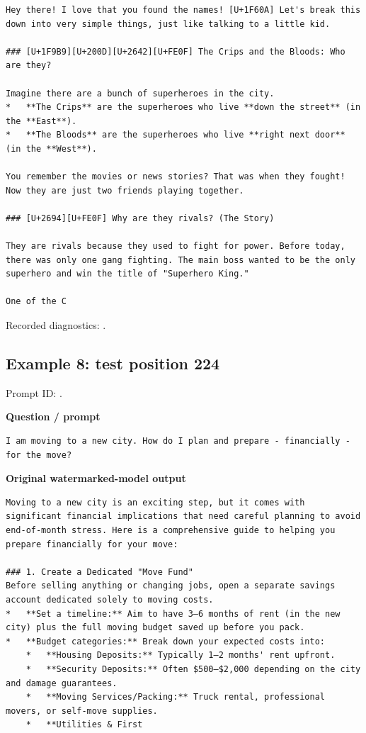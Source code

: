 \begin{Verbatim}
Hey there! I love that you found the names! [U+1F60A] Let's break this down into very simple things, just like talking to a little kid.

### [U+1F9B9][U+200D][U+2642][U+FE0F] The Crips and the Bloods: Who are they?

Imagine there are a bunch of superheroes in the city.
*   **The Crips** are the superheroes who live **down the street** (in the **East**).
*   **The Bloods** are the superheroes who live **right next door** (in the **West**).

You remember the movies or news stories? That was when they fought! Now they are just two friends playing together.

### [U+2694][U+FE0F] Why are they rivals? (The Story)

They are rivals because they used to fight for power. Before today, there was only one gang fighting. The main boss wanted to be the only superhero and win the title of "Superhero King."

One of the C
\end{Verbatim}

Recorded diagnostics:
\texttt{}.

\subsection{Example 8: test position
224}\label{record-docs-watermarking-qualitative-text-textseal2-smoothing-md-example-8-test-position-224}

Prompt ID:
\texttt{}.

\textbf{Question / prompt}

\begin{Verbatim}
I am moving to a new city. How do I plan and prepare - financially - for the move?
\end{Verbatim}

\textbf{Original watermarked-model output}

\begin{Verbatim}
Moving to a new city is an exciting step, but it comes with significant financial implications that need careful planning to avoid end-of-month stress. Here is a comprehensive guide to helping you prepare financially for your move:

### 1. Create a Dedicated "Move Fund"
Before selling anything or changing jobs, open a separate savings account dedicated solely to moving costs.
*   **Set a timeline:** Aim to have 3–6 months of rent (in the new city) plus the full moving budget saved up before you pack.
*   **Budget categories:** Break down your expected costs into:
    *   **Housing Deposits:** Typically 1–2 months' rent upfront.
    *   **Security Deposits:** Often $500–$2,000 depending on the city and damage guarantees.
    *   **Moving Services/Packing:** Truck rental, professional movers, or self-move supplies.
    *   **Utilities & First
\end{Verbatim}

